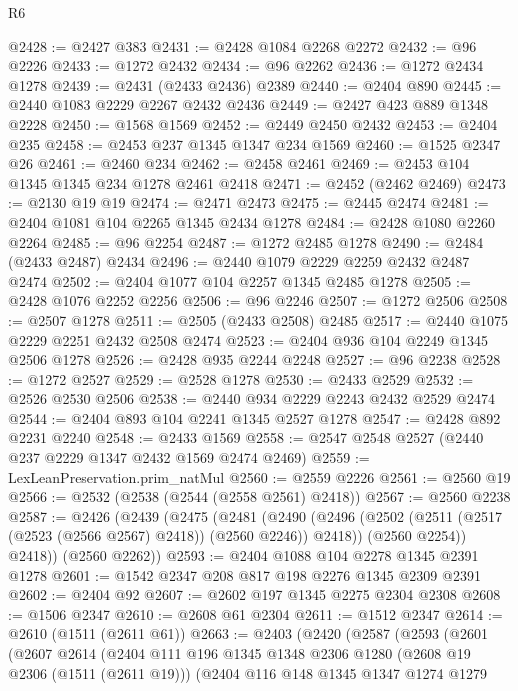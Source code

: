 \begin{lexlean}{R6}
\begin{coremodule}
@2428 := @2427 @383
@2431 := @2428 @1084 @2268 @2272
@2432 := @96 @2226
@2433 := @1272 @2432
@2434 := @96 @2262
@2436 := @1272 @2434 @1278
@2439 := @2431 (@2433 @2436) @2389
@2440 := @2404 @890
@2445 := @2440 @1083 @2229 @2267 @2432 @2436
@2449 := @2427 @423 @889 @1348 @2228
@2450 := @1568 @1569
@2452 := @2449 @2450 @2432
@2453 := @2404 @235
@2458 := @2453 @237 @1345 @1347 @234 @1569
@2460 := @1525 @2347 @26
@2461 := @2460 @234
@2462 := @2458 @2461
@2469 := @2453 @104 @1345 @1345 @234 @1278 @2461 @2418
@2471 := @2452 (@2462 @2469)
@2473 := @2130 @19 @19
@2474 := @2471 @2473
@2475 := @2445 @2474
@2481 := @2404 @1081 @104 @2265 @1345 @2434 @1278
@2484 := @2428 @1080 @2260 @2264
@2485 := @96 @2254
@2487 := @1272 @2485 @1278
@2490 := @2484 (@2433 @2487) @2434
@2496 := @2440 @1079 @2229 @2259 @2432 @2487 @2474
@2502 := @2404 @1077 @104 @2257 @1345 @2485 @1278
@2505 := @2428 @1076 @2252 @2256
@2506 := @96 @2246
@2507 := @1272 @2506
@2508 := @2507 @1278
@2511 := @2505 (@2433 @2508) @2485
@2517 := @2440 @1075 @2229 @2251 @2432 @2508 @2474
@2523 := @2404 @936 @104 @2249 @1345 @2506 @1278
@2526 := @2428 @935 @2244 @2248
@2527 := @96 @2238
@2528 := @1272 @2527
@2529 := @2528 @1278
@2530 := @2433 @2529
@2532 := @2526 @2530 @2506
@2538 := @2440 @934 @2229 @2243 @2432 @2529 @2474
@2544 := @2404 @893 @104 @2241 @1345 @2527 @1278
@2547 := @2428 @892 @2231 @2240
@2548 := @2433 @1569
@2558 := @2547 @2548 @2527 (@2440 @237 @2229 @1347 @2432 @1569 @2474 @2469)
@2559 := LexLeanPreservation.prim_natMul
@2560 := @2559 @2226
@2561 := @2560 @19
@2566 := @2532 (@2538 (@2544 (@2558 @2561) @2418))
@2567 := @2560 @2238
@2587 := @2426
    (@2439
      (@2475
        (@2481
          (@2490
            (@2496 (@2502 (@2511 (@2517 (@2523 (@2566 @2567) @2418)) (@2560 @2246)) @2418))
            (@2560 @2254))
          @2418))
      (@2560 @2262))
@2593 := @2404 @1088 @104 @2278 @1345 @2391 @1278
@2601 := @1542 @2347 @208 @817 @198 @2276 @1345 @2309 @2391
@2602 := @2404 @92
@2607 := @2602 @197 @1345 @2275 @2304 @2308
@2608 := @1506 @2347
@2610 := @2608 @61 @2304
@2611 := @1512 @2347
@2614 := @2610 (@1511 (@2611 @61))
@2663 := @2403
    (@2420
      (@2587
        (@2593
          (@2601
            (@2607
              @2614
              (@2404
                @111
                @196
                @1345
                @1348
                @2306
                @1280
                (@2608 @19 @2306 (@1511 (@2611 @19)))
                (@2404
                  @116
                  @148
                  @1345
                  @1347
                  @1274
                  @1279

\end{coremodule}
\end{lexlean}
